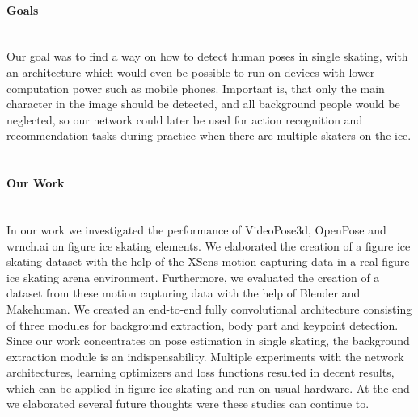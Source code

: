     \paragraph{Goals}\mbox{}\\
    Our goal was to find a way on how to detect human poses in single skating, with an architecture which would even
    be possible to run on devices with lower computation power such as mobile phones.
    Important is, that only the main character in the image should be detected, and all background people would be
    neglected, so our network could later be used for action recognition and recommendation tasks during practice when
    there are multiple skaters on the ice.
\\\mbox{}\\
    \paragraph{Our Work}\mbox{}\\
    In our work we investigated the performance of VideoPose3d, OpenPose and wrnch.ai on figure ice skating elements.
    We elaborated the creation of a figure ice skating dataset with the help of the XSens motion capturing data in a
    real figure ice skating arena
    environment.
    Furthermore, we evaluated the creation of a dataset from these motion capturing data with the help of Blender and
    Makehuman.
    We created an end-to-end fully convolutional architecture consisting of three modules for background extraction,
    body part and keypoint detection.
    Since our work concentrates on pose estimation in single skating, the background extraction module is
    an indispensability.
    Multiple experiments with the network architectures, learning optimizers and loss functions resulted in decent
    results,
    which can be applied in figure ice-skating and run on usual hardware.
    At the end we elaborated several future thoughts were these studies can continue to.



